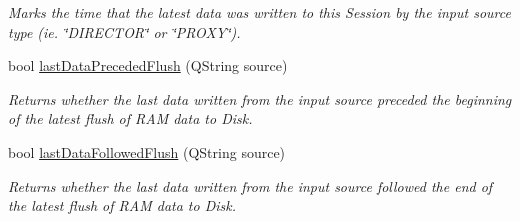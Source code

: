 \begin{DoxyCompactItemize}
\begin{DoxyCompactList}\small\item\em Marks the time that the latest data was written to this Session by the input source type (ie. \char`\"{}\-D\-I\-R\-E\-C\-T\-O\-R\char`\"{} or \char`\"{}\-P\-R\-O\-X\-Y\char`\"{}). \end{DoxyCompactList}\item 
\hypertarget{class_session_info_a5ed2bbb223d5a377502bf6b41f383c07}{bool \hyperlink{class_session_info_a5ed2bbb223d5a377502bf6b41f383c07}{last\-Data\-Preceded\-Flush} (Q\-String source)}\label{class_session_info_a5ed2bbb223d5a377502bf6b41f383c07}

\begin{DoxyCompactList}\small\item\em Returns whether the last data written from the input source preceded the beginning of the latest flush of R\-A\-M data to Disk. \end{DoxyCompactList}\item 
\hypertarget{class_session_info_ad92d5a3911badfa2278b0082c31a826b}{bool \hyperlink{class_session_info_ad92d5a3911badfa2278b0082c31a826b}{last\-Data\-Followed\-Flush} (Q\-String source)}\label{class_session_info_ad92d5a3911badfa2278b0082c31a826b}

\begin{DoxyCompactList}\small\item\em Returns whether the last data written from the input source followed the end of the latest flush of R\-A\-M data to Disk. \end{DoxyCompactList}\end{DoxyCompactItemize}
